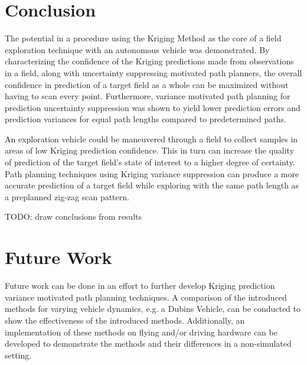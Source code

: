 \chapter*{Conclusion}
The potential in a procedure using the Kriging Method as the core of a field exploration technique with an autonomous vehicle was demonstrated. By characterizing the confidence of the Kriging predictions made from observations in a field, along with uncertainty suppressing motivated path planners, the overall confidence in prediction of a target field as a whole can be maximized without having to scan every point. Furthermore, variance motivated path planning for prediction uncertainty suppression was shown to yield lower prediction errors and prediction variances for equal path lengths compared to predetermined paths.

An exploration vehicle could be maneuvered through a field to collect samples in areas of low Kriging prediction confidence. This in turn can increase the quality of prediction of the target field's state of interest to a higher degree of certainty. Path planning techniques using Kriging variance suppression can produce a more accurate prediction of a target field while exploring with the same path length as a preplanned zig-zag scan pattern.

TODO: draw conclusions from results

\chapter*{Future Work}
Future work can be done in an effort to further develop Kriging prediction variance motivated path planning techniques. A comparison of the introduced methods for varying vehicle dynamics, e.g. a Dubins Vehicle, can be conducted to show the effectiveness of the introduced methods. Additionally, an implementation of these methods on flying and/or driving hardware can be developed to demonstrate the methods and their differences in a non-simulated setting.

